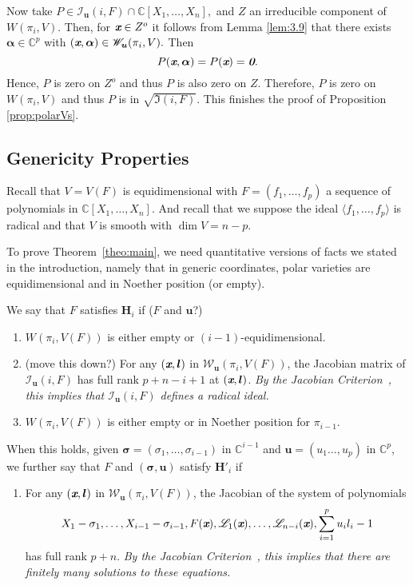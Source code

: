 \documentclass[a4paper]{article}
\def\bz{\textit{\textbf{0}}}
\def\ub{{\bm u}}
\def\lb{{\bm l}}
\def\xb{\textit{\textbf{x}}}
\def\C{\mathbb{C}}
\def\Wi{W(\pi_i,V)}
\def\Iir{\sqrt{\mathfrak{I}(i,F)}}
\def\Iil{\mathscr{I}_{\ub}(i,F)}
\def\Wil{\mathscr{W}_{\ub}(\pi_i,V)}
\begin{document}
%
%
%
\noindent 
Now take $P \in \Iil\cap \C[X_1,\hdots,X_n],$ and $Z$ an irreducible component of $\Wi.$ Then, for $\xb \in Z^o$ it follows from Lemma \ref{lem:3.9} that there exists $\bm \alpha \in \C^p$ with $(\xb, \bm \alpha) \in \Wil.$ Then 
\[
P(\xb, \bm \alpha) = P(\xb) = \bz.
\]
Hence, $P$ is zero on $Z^o$ and thus $P$ is also zero on $Z$. Therefore, $P$ is zero on $\Wi$ and thus $P$ is in $\Iir.$ This finishes the proof of Proposition \ref{prop:polarVs}. 
%













\subsection{Genericity Properties}\label{sec:gen}
Recall that $V=V(F)$ is equidimensional with $F = (f_1,\hdots,f_p)$ a sequence of polynomials in  $\C[X_1,\hdots,X_n]$. And recall that we suppose the ideal $\langle f_1,\hdots, f_p \rangle $ is radical and that $V$ is smooth with $\dim V = n-p$. 

To prove Theorem~\ref{theo:main}, we need quantitative
versions of facts we stated in the introduction, namely that in generic coordinates,
polar varieties are  equidimensional and in Noether position
(or empty).

We say that $F$ satisfies $\textbf{H}_i$ if ($F$ and $\ub$?)
\begin{enumerate}
\item  $W(\pi_i,V(F))$ is either empty or $(i-1)$-equidimensional.
\item (move this down?) For any $(\xb,\lb)$ in $\mathscr{W}_{\ub}(\pi_i,V(F))$, the Jacobian matrix of $\Iil$ has full rank $p+n-i+1$ at $(\xb,\lb)$. {\em By the Jacobian Criterion~\cite[Corollary 16.20]{ECA}, this
  implies that $\Iil$ defines a radical ideal.}
\item $W(\pi_i,V(F))$ is either empty or in Noether position for
  $\pi_{i-1}$.
\smallskip
\end{enumerate}
When this holds, given $\bm \sigma = (\sigma_1,\hdots,\sigma_{i-1})$ 
in $\C^{i-1}$ and $\ub=(u_1\hdots,u_p)$ in $\C^p$, we further say that $F$ and $(\bm \sigma,\ub)$ satisfy
$\textbf{H}'_i$ if
\begin{enumerate}
\item For any $(\xb,\lb)$ in $\mathscr{W}_{\ub}(\pi_i,V(F))$, the Jacobian of the system of polynomials  
\[
 X_1-\sigma_1,\dots,X_{i-1}-\sigma_{i-1},F(\xb), \mathscr{L}_1(\xb), \hdots, \mathscr{L}_{n-i}(\xb),\sum_{i=1}^pu_il_i-1
\]
has full rank $p+n$. {\em By the Jacobian Criterion~\cite[Corollary 16.20]{ECA}, this implies that there are finitely many solutions to these equations.}
\end{enumerate}
\end{document}
